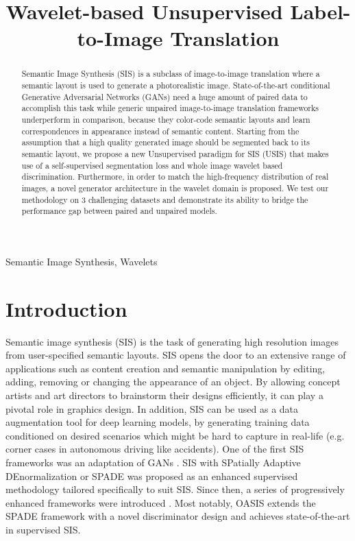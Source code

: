 \documentclass{article}
\title{Wavelet-based Unsupervised Label-to-Image Translation}
\begin{document}
\maketitle
 
\begin{abstract}
Semantic Image Synthesis (SIS) is a subclass of image-to-image translation where a semantic layout is used to generate a photorealistic image. State-of-the-art conditional Generative Adversarial Networks (GANs) need a huge amount of paired data to accomplish this task while generic unpaired image-to-image translation frameworks underperform in comparison, because they color-code semantic layouts and learn correspondences in appearance instead of semantic content. Starting from the assumption that a high quality generated image should be segmented back to its semantic layout, we propose a new Unsupervised paradigm for SIS (USIS) that makes use of a self-supervised segmentation loss and whole image wavelet based discrimination. Furthermore, in order to match the high-frequency distribution of real images, a novel generator architecture in the wavelet domain is proposed. We test our methodology on 3 challenging datasets and demonstrate its ability to bridge the performance gap between paired and unpaired models. 
\end{abstract}

\begin{keywords}
Semantic Image Synthesis,  Wavelets
\end{keywords}
\vspace{-1.3em}
\section{Introduction}
\label{sec:intro}
\vspace{-0.7em}
Semantic image synthesis (SIS) is the task of generating high resolution images from user-specified semantic layouts. SIS opens the door to an extensive range of applications such as content creation and semantic manipulation by editing, adding, removing or changing the appearance of an object. By allowing concept artists and art directors to brainstorm their designs efficiently, it can play a pivotal role in graphics design. In addition, SIS can be used as a data augmentation tool for deep learning models, by generating training data conditioned on desired scenarios which might be hard to capture in real-life (e.g. corner cases in autonomous driving like accidents). One of the first SIS frameworks \cite{wang2018high} was an adaptation of GANs \cite{ Goodfellow2014GenerativeAN, Karras2018ProgressiveGO, Karras2019ASG, Karras2020AnalyzingAI, isola2017image, Gal2021SWAGANAS}. SIS with SPatially Adaptive DEnormalization or SPADE \cite{park2019semantic} was proposed as an enhanced supervised methodology tailored specifically to suit SIS. Since then, a series of progressively enhanced frameworks were introduced \cite{wang2018high, park2019semantic, tan2020rethinking, liu2019learning, Zhu2020SEANIS}. Most notably, OASIS \cite{schonfeld2021you} extends the SPADE framework with a novel discriminator design and achieves state-of-the-art in supervised SIS. 
\end{document}
